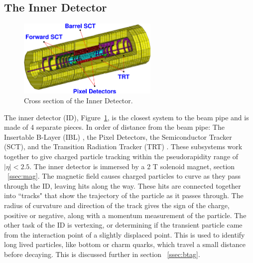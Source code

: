 \subsection{The Inner Detector}
\begin{figure}[h]
\begin{center}
\includegraphics*[width=0.60\textwidth] {figures/inner_3D}%
\caption[Cross section of the Inner Detector.]{Cross section of the Inner Detector.}
\label{fig:ID_cs}
\end{center}
\end{figure}
%
%
The inner detector (ID), Figure~\ref{fig:ID_cs}, is the closest system to the beam pipe and is made of 4 separate pieces. In order of distance from the beam pipe: The Insertable B-Layer (IBL) \cite{Capeans:1291633}, the Pixel Detectors, the Semiconductor Tracker (SCT), and the Transition Radiation Tracker (TRT) \cite{CERN-LHCC-97-016}. These subsystems work together to give charged particle tracking within the pseudorapidity range of ${|\eta| < 2.5}$. The inner detector is immersed by a 2 T solenoid magnet, section ~\ref{ssec:mag}. The magnetic field causes charged particles to curve as they pass through the ID, leaving hits along the way. These hits are connected together into ``tracks" that show the trajectory of the particle as it passes through. The radius of curvature and direction of the track gives the sign of the charge, positive or negative, along with a momentum measurement of the particle. The other task of the ID is vertexing, or determining if the transient particle came from the interaction point of a slightly displaced point. This is used to identify long lived particles, like bottom or charm quarks, which travel a small distance before decaying. This is discussed further in section ~\ref{ssec:btag}. \linebreak
